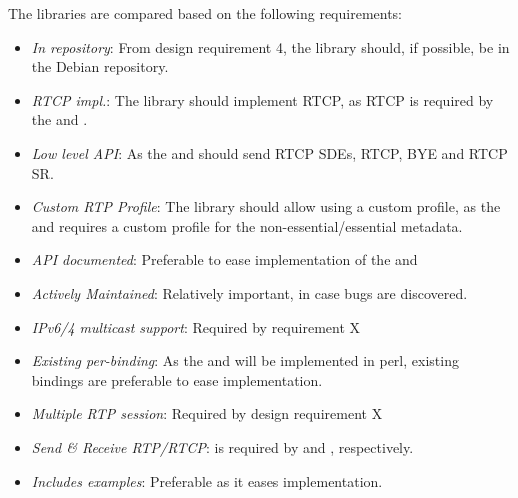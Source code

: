 The libraries are compared based on the following requirements:
\begin{itemize}
	\item \textit{In repository}: From design requirement 4, the library should, if possible, be in the Debian repository.
	\item \textit{RTCP impl.}: The library should implement RTCP, as RTCP is required by the \pub{} and \sub{}.
	\item \textit{Low level API}: As the \pub{} and \sub{} should send RTCP SDEs, RTCP, BYE and RTCP SR.
	\item \textit{Custom RTP Profile}: The library should allow using a custom profile, as the \pub{} and \sub{} requires a custom profile for the non-essential/essential metadata.
	\item \textit{API documented}: Preferable to ease implementation of the \pub{} and \sub{}
	\item \textit{Actively Maintained}: Relatively important, in case bugs are discovered.
	\item \textit{IPv6/4 multicast support}: Required by requirement X 
	\item \textit{Existing per-binding}: As the \pub{} and \sub{} will be implemented in perl, existing bindings are preferable to ease implementation.
	\item \textit{Multiple RTP session}: Required by design requirement X
	\item \textit{Send \& Receive RTP/RTCP}: is required by \pub{} and \sub{}, respectively.
	\item \textit{Includes examples}: Preferable as it eases implementation.
\end{itemize}

